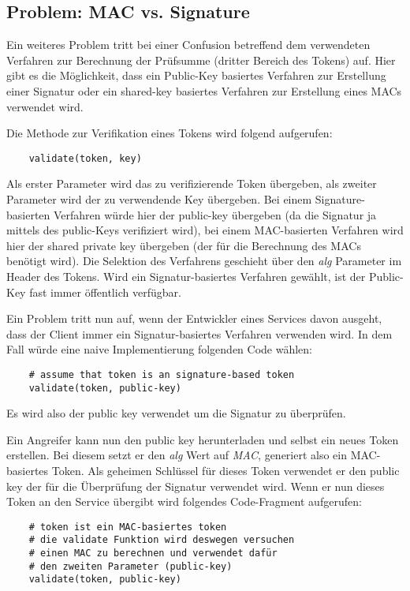 \subsection{Problem: MAC vs. Signature}

Ein weiteres Problem tritt bei einer Confusion betreffend dem verwendeten Verfahren zur Berechnung der Prüfsumme (dritter Bereich des Tokens) auf. Hier gibt es die Möglichkeit, dass ein Public-Key basiertes Verfahren zur Erstellung einer Signatur oder ein shared-key basiertes Verfahren zur Erstellung eines MACs verwendet wird.

Die Methode zur Verifikation eines Tokens wird folgend aufgerufen:

\begin{verbatim}
	validate(token, key)
\end{verbatim}

Als erster Parameter wird das zu verifizierende Token übergeben, als zweiter Parameter wird der zu verwendende Key übergeben. Bei einem Signature-basierten Verfahren würde hier der public-key übergeben (da die Signatur ja mittels des public-Keys verifiziert wird), bei einem MAC-basierten Verfahren wird hier der shared private key übergeben (der für die Berechnung des MACs benötigt wird). Die Selektion des Verfahrens geschieht über den \textit{alg} Parameter im Header des Tokens. Wird ein Signatur-basiertes Verfahren gewählt, ist der Public-Key fast immer öffentlich verfügbar.

Ein Problem tritt nun auf, wenn der Entwickler eines Services davon ausgeht, dass der Client immer ein Signatur-basiertes Verfahren verwenden wird. In dem Fall würde eine naive Implementierung folgenden Code wählen:

\begin{verbatim}
	# assume that token is an signature-based token
	validate(token, public-key)
\end{verbatim}

Es wird also der public key verwendet um die Signatur zu überprüfen.

Ein Angreifer kann nun den public key herunterladen und selbst ein neues Token erstellen. Bei diesem setzt er den \textit{alg} Wert auf \textit{MAC}, generiert also ein MAC-basiertes Token. Als geheimen Schlüssel für dieses Token verwendet er den public key der für die Überprüfung der Signatur verwendet wird. Wenn er nun dieses Token an den Service übergibt wird folgendes Code-Fragment aufgerufen:

\begin{verbatim}
	# token ist ein MAC-basiertes token
	# die validate Funktion wird deswegen versuchen
	# einen MAC zu berechnen und verwendet dafür
	# den zweiten Parameter (public-key)
	validate(token, public-key)
\end{verbatim}

